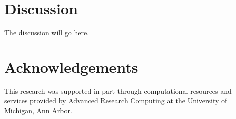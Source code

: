 \documentclass[12pt]{article}
\begin{document}
\section*{Discussion}

The discussion will go here.


\section*{Acknowledgements}

This research was supported in part through computational resources
and services provided by Advanced Research Computing
at the University of Michigan, Ann Arbor.



\end{document}

